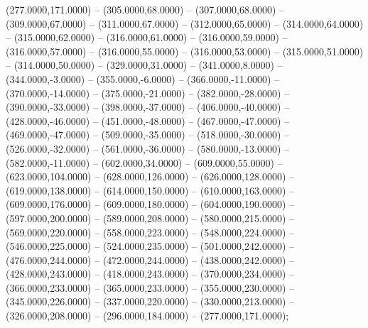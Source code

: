 \begin{scope}[shift={(-276.875,48.125)}]
  \begin{scope}[draw=black,fill=black,line join=round,line width=0.208pt]
       (277.0000,171.0000) -- (305.0000,68.0000) -- (307.0000,68.0000)
        -- (309.0000,67.0000) -- (311.0000,67.0000) -- (312.0000,65.0000) --
        (314.0000,64.0000) -- (315.0000,62.0000) -- (316.0000,61.0000) --
        (316.0000,59.0000) -- (316.0000,57.0000) -- (316.0000,55.0000) --
        (316.0000,53.0000) -- (315.0000,51.0000) -- (314.0000,50.0000) --
        (329.0000,31.0000) -- (341.0000,8.0000) -- (344.0000,-3.0000) --
        (355.0000,-6.0000) -- (366.0000,-11.0000) -- (370.0000,-14.0000) --
        (375.0000,-21.0000) -- (382.0000,-28.0000) -- (390.0000,-33.0000) --
        (398.0000,-37.0000) -- (406.0000,-40.0000) -- (428.0000,-46.0000) --
        (451.0000,-48.0000) -- (467.0000,-47.0000) -- (469.0000,-47.0000) --
        (509.0000,-35.0000) -- (518.0000,-30.0000) -- (526.0000,-32.0000) --
        (561.0000,-36.0000) -- (580.0000,-13.0000) -- (582.0000,-11.0000) --
        (602.0000,34.0000) -- (609.0000,55.0000) -- (623.0000,104.0000) --
        (628.0000,126.0000) -- (626.0000,128.0000) -- (619.0000,138.0000) --
        (614.0000,150.0000) -- (610.0000,163.0000) -- (609.0000,176.0000) --
        (609.0000,180.0000) -- (604.0000,190.0000) -- (597.0000,200.0000) --
        (589.0000,208.0000) -- (580.0000,215.0000) -- (569.0000,220.0000) --
        (558.0000,223.0000) -- (548.0000,224.0000) -- (546.0000,225.0000) --
        (524.0000,235.0000) -- (501.0000,242.0000) -- (476.0000,244.0000) --
        (472.0000,244.0000) -- (438.0000,242.0000) -- (428.0000,243.0000) --
        (418.0000,243.0000) -- (370.0000,234.0000) -- (366.0000,233.0000) --
        (365.0000,233.0000) -- (355.0000,230.0000) -- (345.0000,226.0000) --
        (337.0000,220.0000) -- (330.0000,213.0000) -- (326.0000,208.0000) --
        (296.0000,184.0000) -- (277.0000,171.0000);
  \end{scope}
\end{scope}
